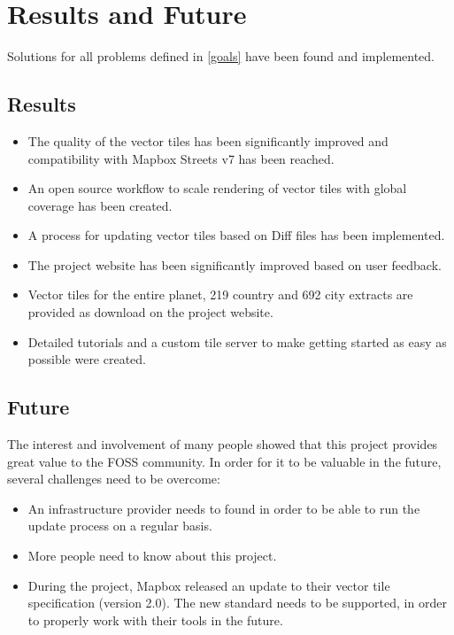 \chapter{Results and Future}\label{part1_results_and_future}

Solutions for all problems defined in \autoref{goals} have been found and implemented.

\section{Results}\label{part1_results}

\begin{itemize}
    \item The quality of the vector tiles has been significantly improved and compatibility with Mapbox Streets v7 has been reached.
    \item An open source workflow to scale rendering of vector tiles with global coverage has been created.
    \item A process for updating vector tiles based on \osm{} Diff files has been implemented.
    \item The project website has been significantly improved based on user feedback.
    \item Vector tiles for the entire planet, 219 country and 692 city extracts are provided as download on the project website.
    \item Detailed tutorials and a custom tile server to make getting started as easy as possible were created.
\end{itemize}

\section{Future}\label{part1_future}

The interest and involvement of many people showed that this project provides great value to the FOSS community. In order for it to be valuable in the future, several challenges need to be overcome:

\begin{itemize}
    \item An infrastructure provider needs to found in order to be able to run the update process on a regular basis.
    \item More people need to know about this project.
    \item During the project, Mapbox released an update to their vector tile specification (version 2.0). The new standard needs to be supported, in order to properly work with their tools in the future.
\end{itemize}


